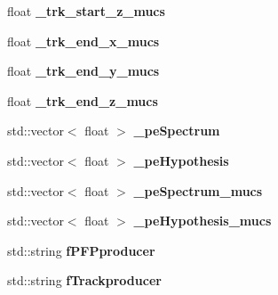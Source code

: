 \begin{DoxyCompactItemize}
\item 
float {\bfseries \+\_\+trk\+\_\+start\+\_\+z\+\_\+mucs}\hypertarget{classMuCSFlashMatch_a757af18fa31ba2da2099023c4af05438}{}\label{classMuCSFlashMatch_a757af18fa31ba2da2099023c4af05438}

\item 
float {\bfseries \+\_\+trk\+\_\+end\+\_\+x\+\_\+mucs}\hypertarget{classMuCSFlashMatch_ab8bf9c0a1e791631716ffa579e51a2b0}{}\label{classMuCSFlashMatch_ab8bf9c0a1e791631716ffa579e51a2b0}

\item 
float {\bfseries \+\_\+trk\+\_\+end\+\_\+y\+\_\+mucs}\hypertarget{classMuCSFlashMatch_a6ed4d1d6e27847f17a9536d60cfa849d}{}\label{classMuCSFlashMatch_a6ed4d1d6e27847f17a9536d60cfa849d}

\item 
float {\bfseries \+\_\+trk\+\_\+end\+\_\+z\+\_\+mucs}\hypertarget{classMuCSFlashMatch_a23578eeaa8612076197aea04428a7485}{}\label{classMuCSFlashMatch_a23578eeaa8612076197aea04428a7485}

\item 
std\+::vector$<$ float $>$ {\bfseries \+\_\+pe\+Spectrum}\hypertarget{classMuCSFlashMatch_a0f842c11463fffdab3be14c17853185e}{}\label{classMuCSFlashMatch_a0f842c11463fffdab3be14c17853185e}

\item 
std\+::vector$<$ float $>$ {\bfseries \+\_\+pe\+Hypothesis}\hypertarget{classMuCSFlashMatch_ac4220bb90ad9debcc818b8273f0fb6c6}{}\label{classMuCSFlashMatch_ac4220bb90ad9debcc818b8273f0fb6c6}

\item 
std\+::vector$<$ float $>$ {\bfseries \+\_\+pe\+Spectrum\+\_\+mucs}\hypertarget{classMuCSFlashMatch_a7976b1923f812d693d90d8483fc275a3}{}\label{classMuCSFlashMatch_a7976b1923f812d693d90d8483fc275a3}

\item 
std\+::vector$<$ float $>$ {\bfseries \+\_\+pe\+Hypothesis\+\_\+mucs}\hypertarget{classMuCSFlashMatch_a41563fc0fde7d884bc82a5843b4bbacb}{}\label{classMuCSFlashMatch_a41563fc0fde7d884bc82a5843b4bbacb}

\item 
std\+::string {\bfseries f\+P\+F\+Pproducer}\hypertarget{classMuCSFlashMatch_a633ec89d3a0296320809bbb81be8cbd8}{}\label{classMuCSFlashMatch_a633ec89d3a0296320809bbb81be8cbd8}

\item 
std\+::string {\bfseries f\+Trackproducer}\hypertarget{classMuCSFlashMatch_a2c3c957fd102a157d26b853ba9507058}{}\label{classMuCSFlashMatch_a2c3c957fd102a157d26b853ba9507058}


\end{DoxyCompactItemize}
